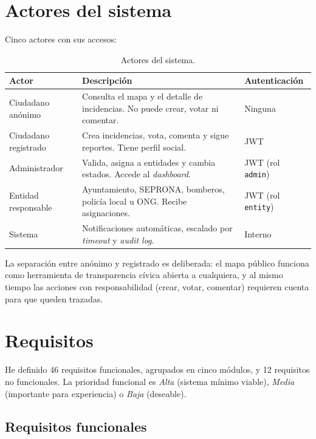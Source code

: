 \section{Actores del sistema}
\label{sec:actores}

Cinco actores con sus accesos:

\begin{table}[H]
\centering
\caption{Actores del sistema.}
\label{tab:actores}
\small
\begin{tabular}{@{}L{3.2cm}L{7.5cm}L{3cm}@{}}
\toprule
\textbf{Actor} & \textbf{Descripción} & \textbf{Autenticación} \\
\midrule
Ciudadano anónimo       & Consulta el mapa y el detalle de incidencias. No puede crear, votar ni comentar. & Ninguna \\
Ciudadano registrado    & Crea incidencias, vota, comenta y sigue reportes. Tiene perfil social. & JWT \\
Administrador           & Valida, asigna a entidades y cambia estados. Accede al \textit{dashboard}. & JWT (rol \texttt{admin}) \\
Entidad responsable     & Ayuntamiento, SEPRONA, bomberos, policía local u ONG. Recibe asignaciones. & JWT (rol \texttt{entity}) \\
Sistema                 & Notificaciones automáticas, escalado por \textit{timeout} y \textit{audit log}. & Interno \\
\bottomrule
\end{tabular}
\end{table}

La separación entre anónimo y registrado es deliberada: el mapa público funciona como herramienta de transparencia cívica abierta a cualquiera, y al mismo tiempo las acciones con responsabilidad (crear, votar, comentar) requieren cuenta para que queden trazadas.


\section{Requisitos}
\label{sec:requisitos}

He definido 46 requisitos funcionales, agrupados en cinco módulos, y 12 requisitos no funcionales. La prioridad funcional es \textit{Alta} (sistema mínimo viable), \textit{Media} (importante para experiencia) o \textit{Baja} (deseable).


\subsection{Requisitos funcionales}
\label{subsec:rf}

